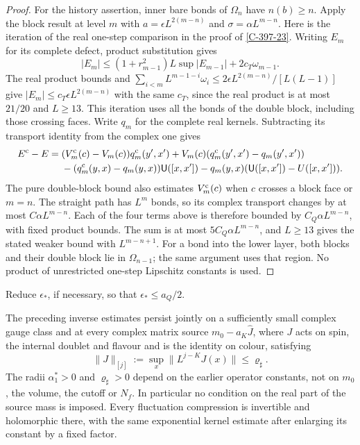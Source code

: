 \documentclass[11pt,letterpaper,reqno]{amsart}
\makeatletter
\theoremstyle{definition}
\newcommand{\ms@minorstart}{%
  \pushQED{\qed}\renewcommand{\qedsymbol}{$\blacksquare$}}
\newenvironment{lemma}[1][]{\ms@minorstart\ms@lemma[#1]}
  {\popQED\endms@lemma}
\theoremstyle{remark}
\makeatother
\begin{document}
\begin{proof}
For the history assertion, inner bare bonds of $\Omega_n$
have $n(b)\ge n$. Apply the block result at level $m$ with
$a=\epsilon L^{2(m-n)}$ and
$\sigma=\alpha L^{m-n}$. Here is the iteration of the real
one-step comparison in the proof of \cref{C-397-23}.
Writing $E_m$ for its complete defect, product substitution
gives
\[
 |E_m|\le(1+r_{m-1}^2)L\sup|E_{m-1}|
                                  +2c_T\omega_{m-1}.
\]
The real product bounds and
$\sum_{i<m}L^{m-1-i}\omega_i
 \le2\epsilon L^{2(m-n)}/[L(L-1)]$
give $|E_m|\le c_T\epsilon L^{2(m-n)}$ with the same
$c_T$, since the real product is at most $21/20$ and
$L\ge13$. This iteration
uses all the bonds of the double block, including those
crossing faces. Write $q_m$ for the complete real kernels.
Subtracting its transport identity from the complex one gives
\[
 \begin{split}
 E^{\rm c}-E={}&(V_m^{\rm c}(c)-V_m(c))q_m^{\rm c}(y',x')
       +V_m(c)(q_m^{\rm c}(y',x')-q_m(y',x'))\\
 &-(q_m^{\rm c}(y,x)-q_m(y,x))\mathsf U([x,x'])
       -q_m(y,x)(\mathsf U([x,x'])-U([x,x'])).
 \end{split}
\]
The pure double-block bound also estimates $V_m^{\rm c}(c)$
when $c$ crosses a block face or $m=n$. The straight path has
$L^m$ bonds, so its complex transport changes by at most
$C\alpha L^{m-n}$. Each of the four terms above is therefore
bounded by $C_Q\alpha L^{m-n}$, with fixed product bounds.
The sum is at most $5C_Q\alpha L^{m-n}$, and $L\ge13$
gives the stated weaker bound with $L^{m-n+1}$.
For a bond into the lower layer, both blocks
and their double block lie in $\Omega_{n-1}$; the same
argument uses that region. No product of unrestricted
one-step Lipschitz constants is used.
\end{proof}

Reduce $\epsilon_*$, if necessary, so that $\epsilon_*\le a_Q/2$.

\begin{lemma}[Stability]\label{C-397-29}
The preceding inverse estimates persist jointly on a sufficiently
small complex gauge class and at every complex matrix source
$m_0-a_K\hat J$, where $J$ acts on spin, the internal doublet
and flavour and is the identity on colour, satisfying
\[
 \|J\|_{[j]}:=\sup_x\|L^{j-K}J(x)\|\le\varrho_\sharp.
\]
The radii $\alpha_1^*>0$ and $\varrho_\sharp>0$ depend on the
earlier operator constants, not on $m_0$, the volume, the cutoff or
$N_f$.  In particular no condition on the real part of the source
mass is imposed.  Every fluctuation compression is invertible and
holomorphic there, with the same exponential kernel estimate after
enlarging its constant by a fixed factor.
\end{lemma}
\end{document}
